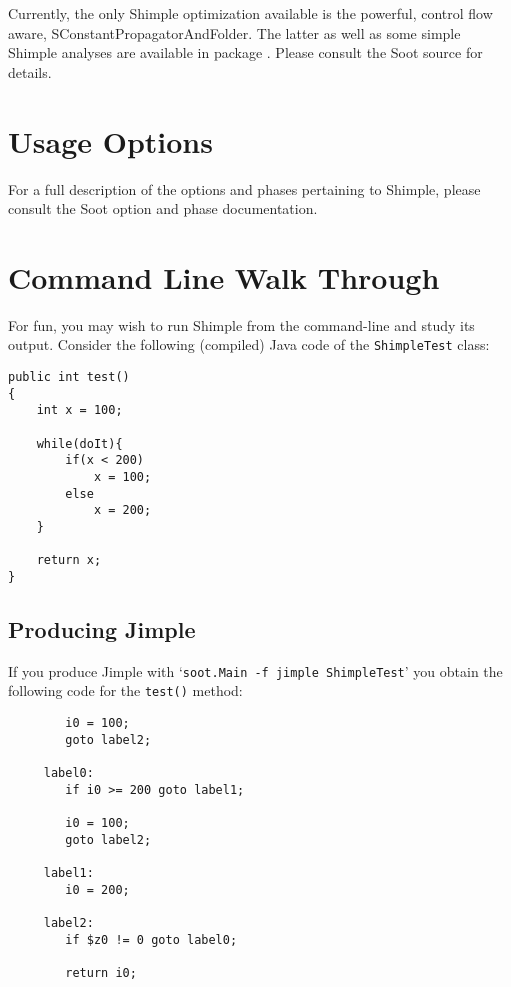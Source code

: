 \documentclass[10pt,letterpaper,oneside,onecolumn]{article}
\begin{document}
Currently, the only Shimple optimization available is the powerful,
control flow aware, SConstantPropagatorAndFolder.  The latter as well
as some simple Shimple analyses are available in package
.
Please consult the Soot source for details.

\section{Usage Options}

For a full description of the options and phases pertaining to
Shimple, please consult the
Soot option and phase documentation.

\section{Command Line Walk Through}

For fun, you may wish to run Shimple from the command-line and study
its output.  Consider the following (compiled) Java code of the 
{\tt ShimpleTest} class:

\begin{verbatim}
public int test()
{
    int x = 100;
        
    while(doIt){
        if(x < 200)
            x = 100;
        else
            x = 200;
    }

    return x;
}
\end{verbatim}

\subsection{Producing Jimple}

If you produce Jimple with `{\tt soot.Main -f jimple ShimpleTest}' you
obtain the following code for the {\tt test()} method:

\begin{verbatim}
        i0 = 100;
        goto label2;

     label0:
        if i0 >= 200 goto label1;

        i0 = 100;
        goto label2;

     label1:
        i0 = 200;

     label2:
        if $z0 != 0 goto label0;

        return i0;
\end{verbatim}
\end{document}
